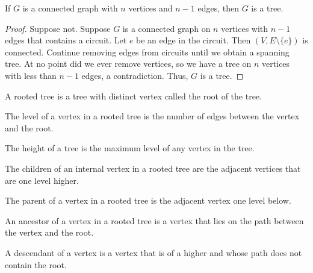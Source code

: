 \documentclass[crop=false,class=book,oneside]{standalone}
\begin{document}
            \begin{theorem}
                If $G$ is a connected graph with $n$ vertices and
                $n-1$ edges, then $G$ is a tree.
            \end{theorem}
            \begin{proof}
                Suppose not. Suppose $G$ is a connected graph
                on $n$ vertices with $n-1$ edges that contains a
                circuit. Let $e$ be an edge in the circuit.
                Then $(V,E\setminus\{e\})$ is connected. Continue removing
                edges from circuits until we obtain a spanning tree.
                At no point did we ever remove vertices, so we have
                a tree on $n$ vertices with less than $n-1$ edges,
                a contradiction. Thus, $G$ is a tree.
            \end{proof}
            \begin{definition}
                A rooted tree is a tree with distinct vertex
                called the root of the tree.
            \end{definition}
            \begin{definition}
                The level of a vertex in a rooted tree is the number
                of edges between the vertex and the root.
            \end{definition}
            \begin{definition}
                The height of a tree is the maximum level of any
                vertex in the tree.
            \end{definition}
            \begin{definition}
                The children of an internal vertex in a rooted tree
                are the adjacent vertices that are one level
                higher.
            \end{definition}
            \begin{definition}
                The parent of a vertex in a rooted tree is
                the adjacent vertex one level below.
            \end{definition}
            \begin{definition}
                An ancestor of a vertex in a rooted tree is a vertex
                that lies on the path between the vertex and the root.
            \end{definition}
            \begin{definition}
                A descendant of a vertex is a vertex that is of a higher
                and whose path does not contain the root.
            \end{definition}
\end{document}
